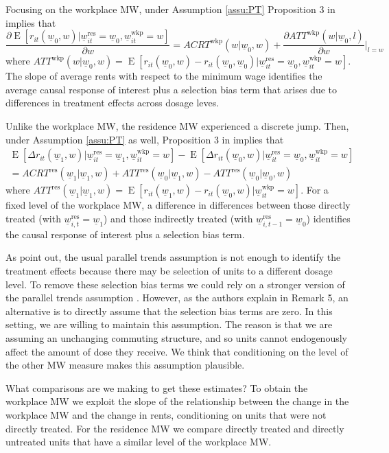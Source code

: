 \documentclass{article}
\newcommand{\mw}{\underline{w}}
\newcommand{\wkp}{\text{wkp}}
\newcommand{\res}{\text{res}}
\DeclareMathOperator{\E}{E}
\begin{document}
Focusing on the workplace MW, under Assumption \ref{assu:PT}
Proposition 3 in \textcite{CallawayEtAl2021} implies that
$$
\frac{\partial \E\left[r_{it}(\mw_0, w) | \mw_{it}^{\res} = \mw_0, \mw_{it}^{\wkp} = w\right]}
     {\partial w} 
    = ACRT^{\wkp}(w | \mw_0, w) + \frac{\partial ATT^{\wkp}(w | \mw_0, l)}{\partial w} \Big|_{l = w}
$$
where $ATT^{\wkp}(w | \mw_0, w) = \E\left[r_{it}(\mw_0, w) - r_{it}(\mw_0, \mw_0) \big| \mw_{it}^{\res} = \mw_0, \mw_{it}^{\wkp} = w\right]$.
The slope of average rents with respect to the minimum wage identifies
the average causal response of interest plus a selection bias term that arises
due to differences in treatment effects across dosage leves.

Unlike the workplace MW, the residence MW experienced a discrete jump.
Then, under Assumption \ref{assu:PT} as well, 
Proposition 3 in \textcite{CallawayEtAl2021} implies that
\begin{equation*}
\begin{split}
\E\left[\Delta r_{it}(\mw_1, w) | \mw_{it}^{\res} = \mw_1, \mw_{it}^{\wkp} = w\right] - \E\left[\Delta r_{it}(\mw_0, w) | \mw_{it}^{\res} = \mw_0, \mw_{it}^{\wkp} = w\right] \\
 = ACRT^{\res}(\mw_1 | \mw_1, w) + ATT^{\res}(\mw_0 | \mw_1, w) - ATT^{\res}(\mw_0 | \mw_0, w)
\end{split}
\end{equation*}
where $ATT^{\res}(\mw_1 | \mw_1, w) = \E\left[r_{it}(\mw_1, w) - r_{it}(\mw_0, w) \big| \mw_{it}^{\wkp} = w\right]$.
For a fixed level of the workplace MW, a difference in differences between
those directly treated (with $\mw^{\res}_{i,t}=\mw_1$) and
those indirectly treated (with $\mw^{\res}_{i,t-1}=\mw_0$) identifies
the causal response of interest plus a selection bias term.

As \textcite{CallawayEtAl2021} point out, the usual parallel trends assumption 
is not enough to identify the treatment effects because there may be 
selection of units to a different dosage level.
To remove these selection bias terms we could rely on a stronger version of
the parallel trends assumption 
\parencite[see Assumption 5 in][]{CallawayEtAl2021}.
However, as the authors explain in Remark 5, an alternative is to directly
assume that the selection bias terms are zero.
In this setting, we are willing to maintain this assumption.
The reason is that we are assuming an unchanging commuting structure, and
so units cannot endogenously affect the amount of dose they receive.
We think that conditioning on the level of the other MW measure makes this
assumption plausible.

What comparisons are we making to get these estimates?
To obtain the workplace MW we exploit the slope of the relationship
between the change in the workplace MW and the change in rents, 
conditioning on units that were not directly treated.
For the residence MW we compare directly treated and directly untreated units
that have a similar level of the workplace MW.
\end{document}
